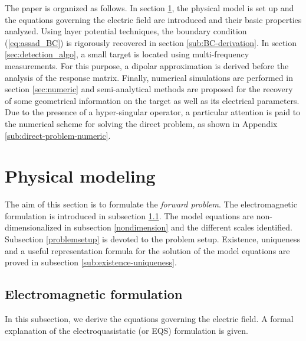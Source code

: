 \documentclass[final]{siamltex}
\numberwithin{equation}{section}
\numberwithin{figure}{section}
\numberwithin{table}{section}
\begin{document}
The paper is organized as follows. In section
\ref{sec:forward_problem}, the physical model is set up and the
equations governing the electric field are introduced and their
basic properties analyzed. Using layer potential techniques, the
boundary condition (\ref{eq:assad_BC}) is rigorously recovered in
section \ref{sub:BC-derivation}. In section
\ref{sec:detection_algo}, a small target is located using
multi-frequency measurements. For this purpose, a dipolar
approximation is derived before the analysis of the response
matrix. Finally, numerical simulations are performed in section
\ref{sec:numeric} and semi-analytical methods are proposed for the
recovery of some geometrical information on the target as well as
its electrical parameters. Due to the presence of a hyper-singular
operator, a particular attention is paid to the numerical scheme
for solving the direct problem, as shown in Appendix
\ref{sub:direct-problem-numeric}.



\section{Physical modeling}

\label{sec:forward_problem}

The aim of this section is to formulate the \emph{forward
problem}. The electromagnetic formulation is introduced in
subsection \ref{sub:setup}. The model equations are
non-dimensionalized in subsection \ref{nondimension} and the
different scales identified. Subsection \ref{problemsetup} is
devoted to the problem setup. Existence, uniqueness and a useful
representation formula for the solution of the model equations are
proved in subsection \ref{sub:existence-uniqueness}.


\subsection{Electromagnetic formulation}

\label{sub:setup}

In this subsection, we derive the equations governing the electric
field. A formal explanation of the electroquasistatic (or EQS)
formulation is given.
\end{document}
